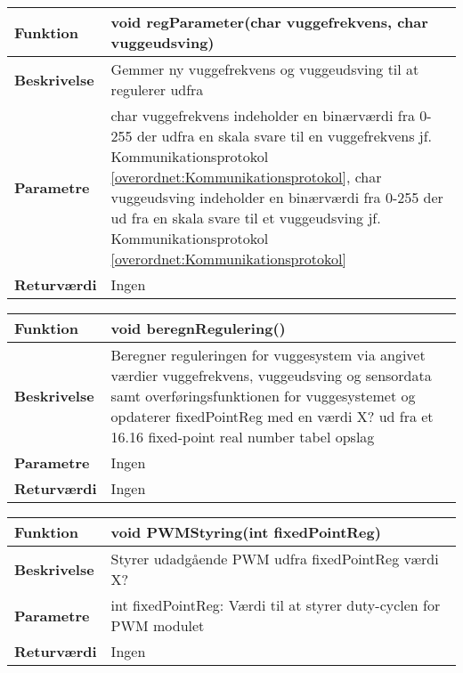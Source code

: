 \begin{center}
    \begin{tabular}{ | l | p{10cm} |}
    \hline
    \textbf{Funktion}	 	& void regParameter(char vuggefrekvens, char vuggeudsving)								\\ \hline
    \textbf{Beskrivelse} 	& Gemmer ny vuggefrekvens og vuggeudsving til at regulerer udfra \\ \hline
    \textbf{Parametre}		& char vuggefrekvens indeholder en binærværdi fra 0-255 der udfra en skala svare til en vuggefrekvens jf. Kommunikationsprotokol \ref{overordnet:Kommunikationsprotokol}, char vuggeudsving indeholder en binærværdi fra 0-255 der ud fra en skala svare til et vuggeudsving jf. Kommunikationsprotokol \ref{overordnet:Kommunikationsprotokol}				 		\\ \hline
    \textbf{Returværdi} 	& Ingen		 												\\ \hline
    \end{tabular}
\end{center}
\begin{center}
    \begin{tabular}{ | l | p{10cm} |}
    \hline
    \textbf{Funktion}	 	& void beregnRegulering()								\\ \hline
    \textbf{Beskrivelse} 	& Beregner reguleringen for vuggesystem via angivet værdier vuggefrekvens, vuggeudsving og sensordata samt overføringsfunktionen for vuggesystemet og opdaterer fixedPointReg med en værdi X? ud fra et 16.16 fixed-point real number tabel opslag \\ \hline
    \textbf{Parametre}		& Ingen													 		\\ \hline
    \textbf{Returværdi} 	& Ingen		 												\\ \hline
    \end{tabular}
\end{center}
\begin{center}
    \begin{tabular}{ | l | p{10cm} |}
    \hline
    \textbf{Funktion}	 	& void PWMStyring(int fixedPointReg)					\\ \hline
    \textbf{Beskrivelse} 	& Styrer udadgående PWM udfra fixedPointReg værdi X?		\\ \hline
    \textbf{Parametre}		& int fixedPointReg: Værdi til at styrer duty-cyclen for PWM modulet												 		\\ \hline
    \textbf{Returværdi} 	& Ingen		 												\\ \hline
    \end{tabular}
\end{center}

